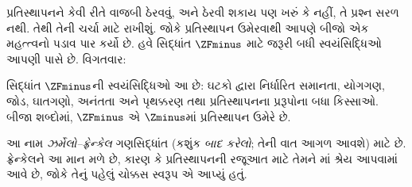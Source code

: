 \documentclass[../../../include/open-logic-section]{subfiles}
\begin{document}

પ્રતિસ્થાપનને કેવી રીતે વાજબી ઠેરવવું, અને ઠેરવી શકાય પણ ખરું કે
નહીં, તે પ્રશ્ન સરળ નથી. તેથી તેની ચર્ચા
 માટે રાખીશું. જોકે પ્રતિસ્થાપન
ઉમેરવાથી આપણે બીજો એક મહત્ત્વનો પડાવ પાર કર્યો છે. હવે સિદ્ધાંત
$\ZFminus$ માટે જરૂરી બધી સ્વયંસિદ્ધિઓ આપણી પાસે છે. વિગતવાર:

\begin{defn}
સિદ્ધાંત $\ZFminus$ની સ્વયંસિદ્ધિઓ આ છે: ઘટકો દ્વારા નિર્ધારિત
સમાનતા, યોગગણ, જોડ, ઘાતગણો, અનંતતા અને પૃથક્કરણ તથા
પ્રતિસ્થાપનના પ્રરૂપોના બધા કિસ્સાઓ. બીજા શબ્દોમાં, $\ZFminus$
એ $\Zminus$માં પ્રતિસ્થાપન ઉમેરે છે.
\end{defn}
\noindent
આ નામ \emph{ઝર્મેલો--ફ્રેન્કેલ} ગણસિદ્ધાંત (કશુંક \emph{બાદ કરેલો};
તેની વાત આગળ આવશે) માટે છે. ફ્રેન્કેલને આ માન મળે છે, કારણ કે
પ્રતિસ્થાપનની રજૂઆત માટે તેમને \citeyear{Fraenkel1922}માં શ્રેય
આપવામાં આવે છે, જોકે તેનું પહેલું ચોક્કસ સ્વરૂપ
\citet{Skolem1922}એ આપ્યું હતું.
\end{document}
